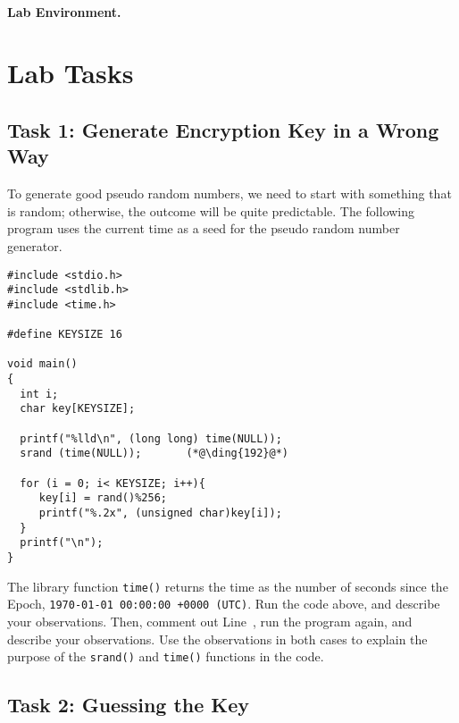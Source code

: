 \paragraph{Lab Environment.} \seedenvironment


\section{Lab Tasks}



\subsection{Task 1: Generate Encryption Key in a Wrong Way}

To generate good pseudo random numbers, we need to start with something
that is random; otherwise, the outcome will be quite predictable. 
The following program uses the current time as a seed for the 
pseudo random number generator.


\begin{lstlisting}[caption="Generating a 128-bit encryption key", label=enc:code:key_gen]
#include <stdio.h>
#include <stdlib.h>
#include <time.h>

#define KEYSIZE 16

void main()
{
  int i;
  char key[KEYSIZE];

  printf("%lld\n", (long long) time(NULL));
  srand (time(NULL));       (*@\ding{192}@*)

  for (i = 0; i< KEYSIZE; i++){
     key[i] = rand()%256;
     printf("%.2x", (unsigned char)key[i]);
  }
  printf("\n");
}
\end{lstlisting}
 

The library function \texttt{time()} returns the time as the number of seconds since the Epoch,
\texttt{1970-01-01 00:00:00 +0000 (UTC)}. Run the code above, and describe your
observations. Then, comment out Line~, run the program again, and describe your
observations. Use the observations in both cases to explain the purpose of 
the \texttt{srand()} and \texttt{time()} functions in the code. 




\subsection{Task 2: Guessing the Key}


